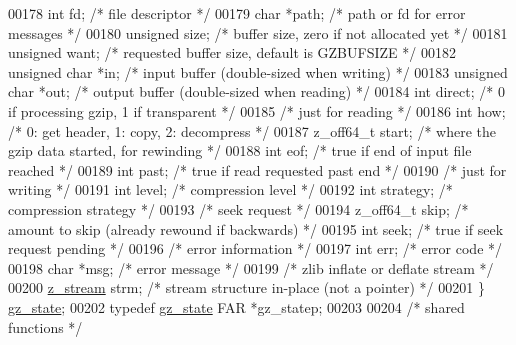 \begin{DoxyCode}
00178     \textcolor{keywordtype}{int} fd;                 \textcolor{comment}{/* file descriptor */}
00179     \textcolor{keywordtype}{char} *path;             \textcolor{comment}{/* path or fd for error messages */}
00180     \textcolor{keywordtype}{unsigned} size;          \textcolor{comment}{/* buffer size, zero if not allocated yet */}
00181     \textcolor{keywordtype}{unsigned} want;          \textcolor{comment}{/* requested buffer size, default is GZBUFSIZE */}
00182     \textcolor{keywordtype}{unsigned} \textcolor{keywordtype}{char} *in;      \textcolor{comment}{/* input buffer (double-sized when writing) */}
00183     \textcolor{keywordtype}{unsigned} \textcolor{keywordtype}{char} *out;     \textcolor{comment}{/* output buffer (double-sized when reading) */}
00184     \textcolor{keywordtype}{int} direct;             \textcolor{comment}{/* 0 if processing gzip, 1 if transparent */}
00185         \textcolor{comment}{/* just for reading */}
00186     \textcolor{keywordtype}{int} how;                \textcolor{comment}{/* 0: get header, 1: copy, 2: decompress */}
00187     z\_off64\_t start;        \textcolor{comment}{/* where the gzip data started, for rewinding */}
00188     \textcolor{keywordtype}{int} eof;                \textcolor{comment}{/* true if end of input file reached */}
00189     \textcolor{keywordtype}{int} past;               \textcolor{comment}{/* true if read requested past end */}
00190         \textcolor{comment}{/* just for writing */}
00191     \textcolor{keywordtype}{int} level;              \textcolor{comment}{/* compression level */}
00192     \textcolor{keywordtype}{int} strategy;           \textcolor{comment}{/* compression strategy */}
00193         \textcolor{comment}{/* seek request */}
00194     z\_off64\_t skip;         \textcolor{comment}{/* amount to skip (already rewound if backwards) */}
00195     \textcolor{keywordtype}{int} seek;               \textcolor{comment}{/* true if seek request pending */}
00196         \textcolor{comment}{/* error information */}
00197     \textcolor{keywordtype}{int} err;                \textcolor{comment}{/* error code */}
00198     \textcolor{keywordtype}{char} *msg;              \textcolor{comment}{/* error message */}
00199         \textcolor{comment}{/* zlib inflate or deflate stream */}
00200     \hyperlink{structz__stream__s}{z\_stream} strm;          \textcolor{comment}{/* stream structure in-place (not a pointer) */}
00201 \} \hyperlink{structgz__state}{gz\_state};
00202 \textcolor{keyword}{typedef} \hyperlink{structgz__state}{gz\_state} FAR *gz\_statep;
00203 
00204 \textcolor{comment}{/* shared functions */}

\end{DoxyCode}
